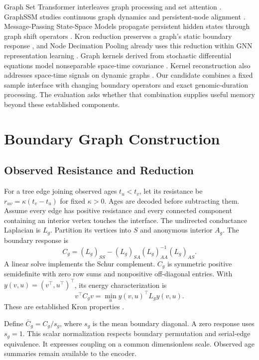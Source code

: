 \documentclass[letterpaper]{article}
\begin{document}
Graph Set Transformer interleaves graph processing and set attention \citep{gst2026}. GraphSSM studies continuous graph dynamics and persistent-node alignment \citep{graphssm2024}. Message-Passing State-Space Models propagate persistent hidden states through graph shift operators \citep{mpssm2026}. Kron reduction preserves a graph's static boundary response \citep{kron2013}, and Node Decimation Pooling already uses this reduction within GNN representation learning \citep{ndp2022}. Graph kernels derived from stochastic differential equations model nonseparable space-time covariance \citep{graphspde2022}. Kernel reconstruction also addresses space-time signals on dynamic graphs \citep{dynamicgraphkernel2017}. Our candidate combines a fixed sample interface with changing boundary operators and exact genomic-duration processing. The evaluation asks whether that combination supplies useful memory beyond these established components.

\section{Boundary Graph Construction}
\subsection{Observed Resistance and Reduction}
For a tree edge joining observed ages $t_u<t_v$, let its resistance be $r_{uv}=\kappa(t_v-t_u)$ for fixed $\kappa>0$. Ages are decoded before subtracting them. Assume every edge has positive resistance and every connected component containing an interior vertex touches the interface. The undirected conductance Laplacian is $L_g$. Partition its vertices into $S$ and anonymous interior $A_g$. The boundary response is
\begin{equation}
 C_g=(L_g)_{SS}-(L_g)_{SA}(L_g)_{AA}^{-1}(L_g)_{AS}.
\end{equation}
A linear solve implements the Schur complement. $C_g$ is symmetric positive semidefinite with zero row sums and nonpositive off-diagonal entries. With $y(v,u)=(v^\top,u^\top)^\top$, its energy characterization is
\begin{equation}
 v^\top C_gv=\min_u y(v,u)^\top L_g y(v,u).
\end{equation}
These are established Kron properties \citep{kron2013}.

Define $\bar C_g=C_g/s_g$, where $s_g$ is the mean boundary diagonal. A zero response uses $s_g=1$. This scalar normalization respects boundary permutation and serial-edge equivalence. It expresses coupling on a common dimensionless scale. Observed age summaries remain available to the encoder.
\end{document}
